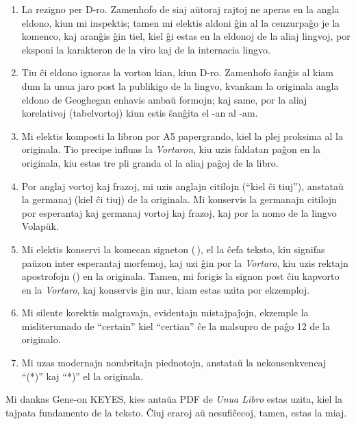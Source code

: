 \documentclass[12pt,twoside]{book}
\begin{document}
\begin{enumerate}

\item La rezigno per D-ro. Zamenhofo de siaj aŭtoraj rajtoj ne aperas en la angla eldono, kiun mi inspektis; tamen mi elektis aldoni ĝin al la cenzurpaĝo je la komenco, kaj aranĝis ĝin tiel, kiel ĝi estas en la eldonoj de la aliaj lingvoj, por eksponi la karakteron de la viro kaj de la internacia lingvo.

\item Tiu ĉi eldono ignoras la vorton \glqq{}kian\grqq{}, kiun D-ro. Zamenhofo ŝanĝis al \glqq{}kiam\grqq{} dum la unua jaro post la publikigo de la lingvo, kvankam la originala angla eldono de Geoghegan enhavis ambaŭ formojn; kaj same, por la aliaj korelativoj (tabelvortoj) kiun estis ŝanĝita el \glqq{}-an\grqq{} al \glqq{}-am\grqq{}.

\item Mi elektis komposti la libron por A5 papergrando, kiel la plej proksima al la originala.  Tio precipe influas la \emph{Vortaron}, kiu uzis faldatan paĝon en la originala, kiu estas tre pli granda ol la aliaj paĝoj de la libro.

\item Por anglaj vortoj kaj frazoj, mi uzis anglajn citilojn (``kiel ĉi tiuj''), anstataŭ la germanaj (\glqq{}kiel ĉi tiuj\grqq{}) de la originala.  Mi konservis la germanajn citilojn por esperantaj kaj germanaj vortoj kaj frazoj, kaj por la nomo de la lingvo Volap\"{u}k.

\item Mi elektis konservi la komecan signeton (\,), el la ĉefa teksto, kiu signifas paŭzon inter esperantaj morfemoj, kaj uzi ĝin por la \emph{Vortaro}, kiu uzis rektajn apostrofojn ({}) en la originala. Tamen, mi forigis la signon post ĉiu kapvorto en la \emph{Vortaro}, kaj konservis ĝin nur, kiam estas uzita por ekzemploj.

\item Mi silente korektis malgravajn, evidentajn mistajpaĵojn, ekzemple la misliterumado de ``certain'' kiel ``certian'' ĉe la malsupro de paĝo 12 de la originalo.

\item Mi uzas modernajn nombritajn piednotojn, anstataŭ la nekonsenkvencaj ``(*)'' kaj ``*)'' el la originala.

\end{enumerate}

Mi dankas Gene-on KEYES, kies antaŭa PDF de \emph{Unua Libro} estas uzita, kiel la tajpata fundamento de la teksto.  Ĉiuj eraroj aŭ nesufiĉecoj, tamen, estas la miaj.
\end{document}
